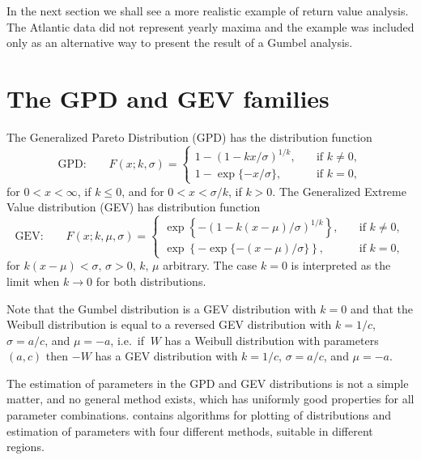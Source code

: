 In the next section we shall see a more realistic example of return
value analysis. The Atlantic data did not represent yearly maxima and
the example was included only as an alternative way to present the result
of a Gumbel analysis.

\section{The GPD and GEV families}\label{sec:GPD_GEV}

The Generalized Pareto Distribution (GPD)
  has the distribution function
\begin{equation}
  \mbox{GPD:} \qquad
  F(x; k, {\sigma})  =
  \left\{
  \begin{array}{ll}
  1 - \left( 1 - kx/{\sigma}\right)^{1/k},
  & \quad \mbox{if $k \neq 0$},\\[0.5em]
  1 - \exp \{-x/{\sigma}\}, & \quad \mbox{if $k = 0$},
  \end{array}
  \right.
  \label{eq:GPD}
\end{equation}
for $0 < x < \infty$, if $k \leq 0$, and for $0 < x < {\sigma}/k$, if $k
> 0$. The Generalized Extreme Value distribution (GEV)
has distribution function
\begin{equation}
  \mbox{GEV:} \qquad F(x; k, {\mu}, {\sigma})  =
  \left\{
  \begin{array}{ll}
  \exp \left\{ - (1 - k(x-{\mu})/{\sigma})^{1/k}\right\},
  & \quad \mbox{if $k \neq 0$},\\[0.5em]
  \exp \left\{ - \exp \{ - (x-{\mu})/{\sigma}\} \right\},
  & \quad \mbox{if $k = 0$},
  \end{array}
  \right. \label{eq:GEV}
\end{equation}
for $k(x - {\mu}) < {\sigma}, \, {\sigma} > 0, \, k, \, {\mu}$
arbitrary.
The case $k=0$ is interpreted as the limit when $k \to 0$ for both
distributions.

Note that the Gumbel distribution is a GEV distribution with $k=0$
and that the Weibull distribution is equal to a reversed GEV
distribution with $k=1/c$, ${\sigma} = a/c$, and  ${\mu} = -a$,
i.e.\ if $~W$ has a Weibull distribution with parameters $(a,
c)$ then $- W$ has a GEV distribution with $k=1/c$, ${\sigma}= a/c$,
and ${\mu} = -a$.

The estimation of parameters in the GPD and GEV distributions is not
a simple matter, and no general method exists, which has uniformly good
properties for all parameter combinations. \progname{} contains
algorithms for plotting of distributions and estimation of parameters
with four different methods, suitable in different regions.

